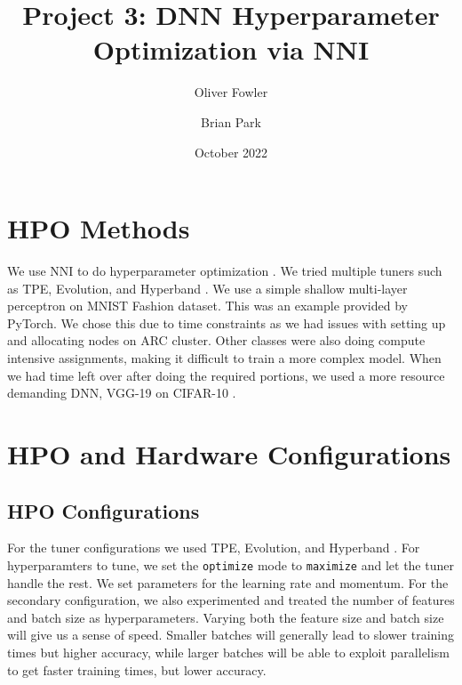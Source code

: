 \documentclass{article}
\title{Project 3: DNN Hyperparameter Optimization via NNI}
\author{Oliver Fowler}
\author{Brian Park}
\affil{North Carolina State University, Computer Science 591/791-025}
\date{October 2022}
\begin{document}
\maketitle




\section{HPO Methods}

We use NNI to do hyperparameter optimization \cite{nni}. We tried multiple tuners such as TPE, Evolution, and Hyperband \cite{tpe, evolution, hyperband}. We use a simple shallow multi-layer perceptron on MNIST Fashion dataset. This was an example provided by PyTorch. We chose this due to time constraints as we had issues with setting up and allocating nodes on ARC cluster. Other classes were also doing compute intensive assignments, making it difficult to train a more complex model. When we had time left over after doing the required portions, we used a more resource demanding DNN, VGG-19 on CIFAR-10 \cite{vgg}.


\section{HPO and Hardware Configurations}

\subsection{HPO Configurations}
For the tuner configurations we used TPE, Evolution, and Hyperband \cite{tpe, evolution, hyperband}. For hyperparamters to tune, we set the \verb|optimize| mode to \verb|maximize| and let the tuner handle the rest. We set parameters for the learning rate and momentum. For the secondary configuration, we also experimented and treated the number of features and batch size as hyperparameters. Varying both the feature size and batch size will give us a sense of speed. Smaller batches will generally lead to slower training times but higher accuracy, while larger batches will be able to exploit parallelism to get faster training times, but lower accuracy.
\end{document}

